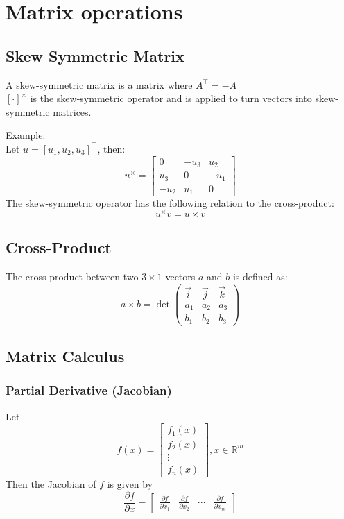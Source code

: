 \appendix

\section{Matrix operations}
\subsection{Skew Symmetric Matrix}
A skew-symmetric matrix is a matrix where $A^\top=-A$\\
$[\cdot]^\times$ is the skew-symmetric operator and is applied to turn vectors into skew-symmetric matrices.

Example:\\
Let $u=[u_1,u_2,u_3]^\top$, then:
$$
u^\times=\begin{bmatrix}
0 & -u_3 & u_2 \\ u_3 & 0 & -u_1 \\ -u_2 & u_1 & 0
\end{bmatrix}
$$
The skew-symmetric operator has the following relation to the cross-product:
$$
u^\times v=u\times v
$$

\subsection{Cross-Product}
The cross-product between two $3\times1$ vectors $a$ and $b$ is defined as:
$$
a\times b = \det
\begin{pmatrix}
\vec{i} & \vec{j} & \vec k \\ a_1  & a_2  & a_3 \\ b_1 & b_2 & b_3
\end{pmatrix}
$$

\subsection{Matrix Calculus}

\subsubsection{Partial Derivative (Jacobian)}
Let
$$
f(x)= 
\begin{bmatrix}
f_1(x) \\  f_2(x) \\ \vdots \\ f_n(x)
\end{bmatrix}
, x\in \mathbb{R}^m
$$
Then the Jacobian of $f$ is given by
$$
\frac{\partial f}{\partial x}=
\begin{bmatrix}
\frac{\partial f}{\partial x_1} & \frac{\partial f}{\partial x_2} & \cdots & \frac{\partial f}{\partial x_m}
\end{bmatrix}
$$


